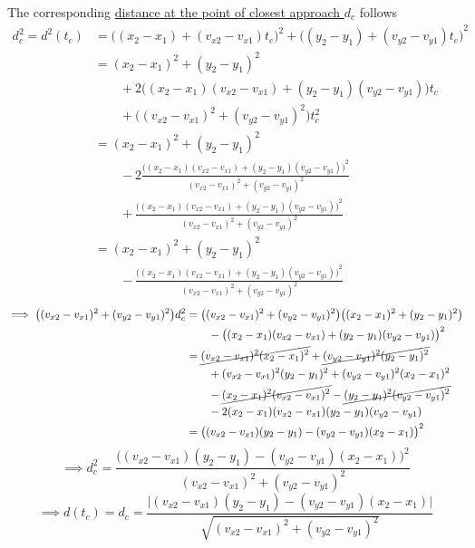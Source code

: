 The corresponding \underline{distance at the point of closest approach \( d_c \)} follows
\begin{align*}
    d_c^2
    = d^2(t_c)
     & =
    {\big((x_2 - x_1) + (v_{x2} - v_{x1})t_c\big)}^2 + {\big((y_2 - y_1) + (v_{y2} - v_{y1})t_c\big)}^2
    \\ & =
    (x_2 - x_1)^2 + (y_2 - y_1)^2
    \\ & \qquad
    + 2\big((x_2 - x_1)(v_{x2} - v_{x1}) + (y_2 - y_1)(v_{y2} - v_{y1})\big)t_c
    \\ & \qquad
    + \big((v_{x2} - v_{x1})^2 + (v_{y2} - v_{y1})^2\big)t_c^2
    \\ & =
    (x_2 - x_1)^2 + (y_2 - y_1)^2
    \\ & \qquad
    - 2\frac{{\big((x_2 - x_1)(v_{x2} - v_{x1}) + (y_2 - y_1)(v_{y2} - v_{y1})\big)}^2}{(v_{x2} - v_{x1})^2 + (v_{y2} - v_{y1})^2}
    \\ & \qquad
    + \frac{{\big((x_2 - x_1)(v_{x2} - v_{x1}) + (y_2 - y_1)(v_{y2} - v_{y1})\big)}^2}{(v_{x2} - v_{x1})^2 + (v_{y2} - v_{y1})^2}
    \\ & =
    (x_2 - x_1)^2 + (y_2 - y_1)^2
    \\ & \qquad
    - \frac{{\big((x_2 - x_1)(v_{x2} - v_{x1}) + (y_2 - y_1)(v_{y2} - v_{y1})\big)}^2}{(v_{x2} - v_{x1})^2 + (v_{y2} - v_{y1})^2}
\end{align*}
\begin{align*}
    \implies
    \big( (v_{x2} - v_{x1})^2 + (v_{y2} - v_{y1})^2 \big) d_c^2
     & =
    \big( (v_{x2} - v_{x1})^2 + (v_{y2} - v_{y1})^2 \big) \big( (x_2 - x_1)^2 + (y_2 - y_1)^2 \big)
    \\ & \qquad
    - \big( (x_2 - x_1)(v_{x2} - v_{x1}) + (y_2 - y_1)(v_{y2} - v_{y1}) \big)^2
    \\ & =
    \cancel{(v_{x2} - v_{x1})^2 (x_2 - x_1)^2} + \cancel{(v_{y2} - v_{y1})^2 (y_2 - y_1)^2}
    \\ & \qquad
    + (v_{x2} - v_{x1})^2 (y_2 - y_1)^2 + (v_{y2} - v_{y1})^2 (x_2 - x_1)^2
    \\ & \qquad
    - \cancel{(x_2 - x_1)^2 (v_{x2} - v_{x1})^2} - \cancel{(y_2 - y_1)^2 (v_{y2} - v_{y1})^2}
    \\ & \qquad
    - 2 (x_2 - x_1)(v_{x2} - v_{x1})(y_2 - y_1)(v_{y2} - v_{y1})
    \\ & =
    \big( (v_{x2} - v_{x1})(y_2 - y_1) - (v_{y2} - v_{y1})(x_2 - x_1) \big)^2
\end{align*}
\begin{equation*}
    \implies
    d_c^2
    =
    \frac{\big( (v_{x2} - v_{x1})(y_2 - y_1) - (v_{y2} - v_{y1})(x_2 - x_1) \big)^2}{(v_{x2} - v_{x1})^2 + (v_{y2} - v_{y1})^2}
\end{equation*}
\begin{equation*}
    \implies
    d(t_c) =
    \boxed{
        d_c
        =
        \frac{\big| (v_{x2} - v_{x1})(y_2 - y_1) - (v_{y2} - v_{y1})(x_2 - x_1) \big|}{\sqrt{(v_{x2} - v_{x1})^2 + (v_{y2} - v_{y1})^2}}
    }
\end{equation*}

